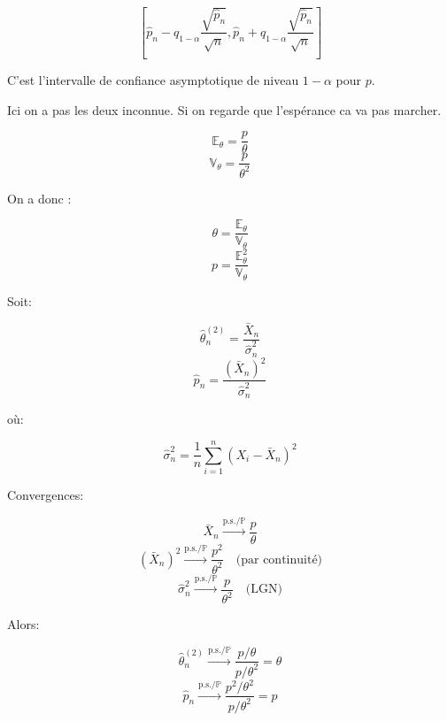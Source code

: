 \begin{correction}
\[
\left[\hat{p}_n - q_{1-\alpha} \frac{\sqrt{\hat{p}_n}}{\sqrt{n}}, \hat{p}_n + q_{1-\alpha} \frac{\sqrt{\hat{p}_n}}{\sqrt{n}}\right]
\]

C'est l'intervalle de confiance asymptotique de niveau $1-\alpha$ pour $p$.

\ques 

Ici on a pas les deux inconnue. Si on regarde que l'espérance ca va pas marcher.

\[
\mathbb{E}_\theta = \frac{p}{\theta}
\]
\[
\mathbb{V}_\theta = \frac{p}{\theta^2}
\]

On a donc :

\[
\theta = \frac{\mathbb{E}_\theta}{\mathbb{V}_\theta}
\]
\[
p = \frac{\mathbb{E}^2_\theta}{\mathbb{V}_\theta}
\]

Soit:

\[
\hat{\theta}^{(2)}_n = \frac{\bar{X}_n}{\hat{\sigma}^2_n}
\]
\[
\hat{p}_n = \frac{(\bar{X}_n)^2}{\hat{\sigma}^2_n}
\]

où:

\[
\hat{\sigma}^2_n = \frac{1}{n} \sum_{i=1}^{n} (X_i - \bar{X}_n)^2
\]

Convergences:

\[
\bar{X}_n \xrightarrow{\text{p.s.} / \mathbb{P}} \frac{p}{\theta}
\]
\[
(\bar{X}_n)^2 \xrightarrow{\text{p.s.} / \mathbb{P}} \frac{p^2}{\theta^2} \quad \text{(par continuité)}
\]
\[
\hat{\sigma}^2_n \xrightarrow{\text{p.s.} / \mathbb{P}} \frac{p}{\theta^2} \quad \text{(LGN)}
\]

Alors:

\[
\hat{\theta}^{(2)}_n \xrightarrow{\text{p.s.} / \mathbb{P}} \frac{p/\theta}{p/\theta^2} = \theta
\]
\[
\hat{p}_n \xrightarrow{\text{p.s.} / \mathbb{P}} \frac{p^2/\theta^2}{p/\theta^2} = p
\]

\end{correction}






















